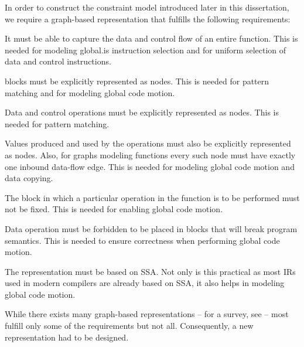 In order to construct the \gls{constraint model} introduced later in this
dissertation, we require a \gls{graph}-based representation that fulfills the
following requirements:
%
\begin{requirements}
  \item {}
    It must be able to capture the data and control flow of an entire
    \gls{function}.
    This is needed for modeling \gls{global.is} \gls{instruction selection}
    and for uniform selection of data and control \glspl{instruction}.
  \item {}
    \Glspl{block} must be explicitly represented as \glspl{node}.
    This is needed for \gls{pattern matching} and for modeling \gls{global code
      motion}.
  \item {}
    Data and control \glspl{operation} must be explicitly represented as
    \glspl{node}.
    This is needed for \gls{pattern matching}.
  \item {}
    Values produced and used by the \glspl{operation} must also be explicitly
    represented as \glspl{node}.
    Also, for \glspl{graph} modeling \glspl{function} every such \gls{node} must
    have exactly one inbound data-flow \gls{edge}.
    This is needed for modeling \gls{global code motion} and \gls{data copying}.
  \item {}
    The \gls{block} in which a particular \gls{operation} in the \gls{function}
    is to be performed must not be fixed.
    This is needed for enabling \gls{global code motion}.
  \item {}
    Data \gls{operation} must be forbidden to be placed in \glspl{block} that
    will break \gls{program} semantics.
    This is needed to ensure correctness when performing \gls{global code
      motion}.
  \item {}
    The representation must be based on \gls{SSA}.
    Not only is this practical as most \glspl{IR} used in modern
    \glspl{compiler} are already based on \gls{SSA}, it also helps in modeling
    \gls{global code motion}.
\end{requirements}

While there exists many \gls{graph}-based representations -- for a survey, see
\cite{StanierWatson:2013} -- most fulfill only some of the requirements but not
all.
%
Consequently, a new representation had to be designed.



